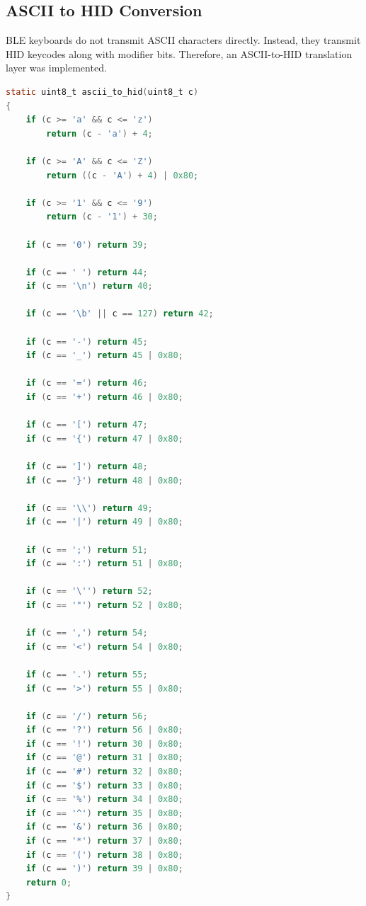 \documentclass[conference]{IEEEtran}
\begin{document}
\subsection{ASCII to HID Conversion}

BLE keyboards do not transmit ASCII characters directly. Instead, they transmit HID keycodes along with modifier bits. Therefore, an ASCII-to-HID translation layer was implemented.

\begin{lstlisting}[language=C]
static uint8_t ascii_to_hid(uint8_t c)
{
    if (c >= 'a' && c <= 'z')
        return (c - 'a') + 4;

    if (c >= 'A' && c <= 'Z')
        return ((c - 'A') + 4) | 0x80;

    if (c >= '1' && c <= '9')
        return (c - '1') + 30;

    if (c == '0') return 39;

    if (c == ' ') return 44;
    if (c == '\n') return 40;

    if (c == '\b' || c == 127) return 42;

    if (c == '-') return 45;
    if (c == '_') return 45 | 0x80;

    if (c == '=') return 46;
    if (c == '+') return 46 | 0x80;

    if (c == '[') return 47;
    if (c == '{') return 47 | 0x80;

    if (c == ']') return 48;
    if (c == '}') return 48 | 0x80;

    if (c == '\\') return 49;
    if (c == '|') return 49 | 0x80;

    if (c == ';') return 51;
    if (c == ':') return 51 | 0x80;

    if (c == '\'') return 52;
    if (c == '"') return 52 | 0x80;

    if (c == ',') return 54;
    if (c == '<') return 54 | 0x80;

    if (c == '.') return 55;
    if (c == '>') return 55 | 0x80;

    if (c == '/') return 56;
    if (c == '?') return 56 | 0x80;
    if (c == '!') return 30 | 0x80;
    if (c == '@') return 31 | 0x80;
    if (c == '#') return 32 | 0x80;
    if (c == '$') return 33 | 0x80;
    if (c == '%') return 34 | 0x80;
    if (c == '^') return 35 | 0x80;
    if (c == '&') return 36 | 0x80;
    if (c == '*') return 37 | 0x80;
    if (c == '(') return 38 | 0x80;
    if (c == ')') return 39 | 0x80;
    return 0;
}
\end{lstlisting}
\end{document}
